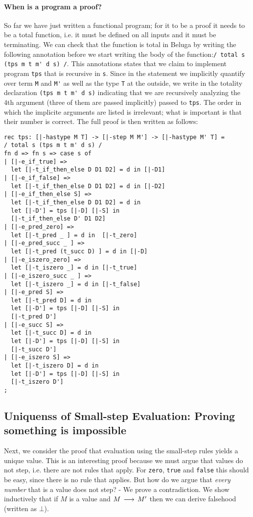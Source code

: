 \paragraph{When is a program a proof?} So far we have just written a
functional program; for it to be a proof it needs to be a total
function, i.e. it must be defined on all inputs and it must be
terminating. We can check that the function is total in Beluga by
writing the following annotation before we start writing the body of
the function:\lstinline!/ total s (tps m t m' d s) /!. This
annotations states that we claim to implement program \lstinline!tps! that is
recursive in \lstinline!s!. Since in the statement we implicitly
quantify over term \lstinline!M! and \lstinline!M'! as well as the
type \lstinline!T! at the outside, we write in the totality
declaration \lstinline!(tps m t m' d s)! indicating that we are
recursively analyzing the 4th argument (three of them are passed
implicitly) passed to \lstinline!tps!. The order in which the
implicite arguments are listed is irrelevant; what is important is
that their number is correct.
The full proof is then written as follows:


\begin{lstlisting}
rec tps: [|-hastype M T] -> [|-step M M'] -> [|-hastype M' T] =
/ total s (tps m t m' d s) /
fn d => fn s => case s of
| [|-e_if_true] =>
  let [|-t_if_then_else D D1 D2] = d in [|-D1]
| [|-e_if_false] =>
  let [|-t_if_then_else D D1 D2] = d in [|-D2]
| [|-e_if_then_else S] =>
  let [|-t_if_then_else D D1 D2] = d in
  let [|-D'] = tps [|-D] [|-S] in
  [|-t_if_then_else D' D1 D2]
| [|-e_pred_zero] =>
  let [|-t_pred _ ] = d in  [|-t_zero]
| [|-e_pred_succ _ ] =>
  let [|-t_pred (t_succ D) ] = d in [|-D]
| [|-e_iszero_zero] =>
  let [|-t_iszero _] = d in [|-t_true]
| [|-e_iszero_succ _ ] =>
  let [|-t_iszero _] = d in [|-t_false]
| [|-e_pred S] =>
  let [|-t_pred D] = d in
  let [|-D'] = tps [|-D] [|-S] in
  [|-t_pred D']
| [|-e_succ S] =>
  let [|-t_succ D] = d in
  let [|-D'] = tps [|-D] [|-S] in
  [|-t_succ D']
| [|-e_iszero S] =>
  let [|-t_iszero D] = d in
  let [|-D'] = tps [|-D] [|-S] in
  [|-t_iszero D']
;
\end{lstlisting}


\subsection{Uniquenss of Small-step Evaluation: Proving something is impossible}
Next, we consider the proof that evaluation using the small-step rules yields a
unique value. This is an interesting proof because we must argue that values do
not step, i.e. there are not rules that apply. For \lstinline!zero!,
\lstinline!true! and \lstinline!false! this should be easy, since there is no
rule that applies. But how do we argue that \emph{every number} that is a value
does not step? - We prove a contradiction. We show inductively that if $M$ is a
value and $M \mathrel{\,\longrightarrow\,} M'$ then we can derive falsehood (written as $\bot$).

